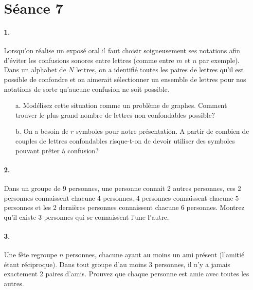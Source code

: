 \section{Séance 7}

\paragraph{1. } Lorsqu'on réalise un exposé oral il faut choisir soigneusement ses notations afin d'éviter les confusions sonores entre lettres (comme entre $m$ et $n$ par exemple). Dans un alphabet de $N$ lettres, on a identifié toutes les paires de lettres qu'il est possible de confondre et on aimerait sélectionner un ensemble de lettres pour nos notations de sorte qu'aucune confusion ne soit possible.
\begin{enumerate}
  \item[a.] Modélisez cette situation comme un problème de graphes. Comment trouver le plus grand nombre de lettres non-confondables possible?
  \item[b.] On a besoin de $r$ symboles pour notre présentation. A partir de combien de couples de lettres confondables risque-t-on de devoir utiliser des symboles pouvant prêter à confusion?
\end{enumerate}


\paragraph{2. } Dans un groupe de 9 personnes, une personne connait 2 autres personnes, ces 2 personnes connaissent chacune 4 personnes, 4 personnes connaissent chacune 5 personnes et les 2 dernières personnes connaissent chacune 6 personnes. Montrez qu'il existe 3 personnes qui se connaissent l'une l'autre.


\paragraph{3. } Une fête regroupe $n$ personnes, chacune ayant au moins un ami présent (l'amitié étant réciproque). Dans tout groupe d'au moins 3 personnes, il n'y a jamais exactement 2 paires d'amis. Prouvez que chaque personne est amie avec toutes les autres.

